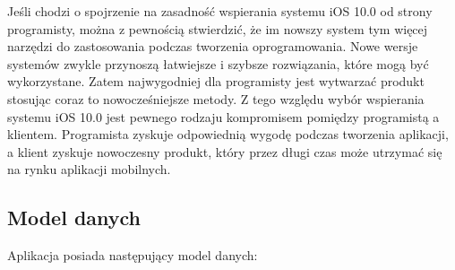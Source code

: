 \documentclass[twoside]{projektInzynierskiMS}
\begin{document}
Jeśli chodzi o spojrzenie na zasadność wspierania systemu iOS 10.0 od strony programisty, można z pewnością stwierdzić, że im nowszy system tym więcej narzędzi do zastosowania podczas tworzenia oprogramowania. Nowe wersje systemów zwykle przynoszą łatwiejsze i szybsze rozwiązania, które mogą być wykorzystane. Zatem najwygodniej dla programisty jest wytwarzać produkt stosując coraz to nowocześniejsze metody. Z tego względu wybór wspierania systemu iOS 10.0 jest pewnego rodzaju kompromisem pomiędzy programistą a klientem. Programista zyskuje odpowiednią wygodę podczas tworzenia aplikacji, a klient zyskuje nowoczesny produkt, który przez długi czas może utrzymać się na rynku aplikacji mobilnych.


\subsection{Model danych}
Aplikacja posiada następujący model danych:
\end{document}
